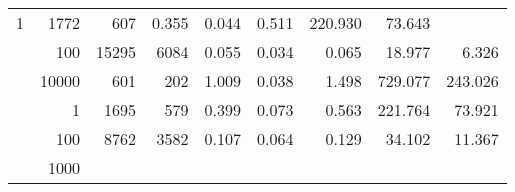 \begin{table}
\begin{tabular}{rrrrrrrrr}
					
					 
					\multirow{ 1 }{*}{ 1 } &
					
						
							    
							     1772  & 607  
	                           & 0.355 & 0.044 & 0.511
	                           & 220.930 & 73.643  \\
	                
	            
					 &  
					 
					\multirow{ 1 }{*}{ 100 } &
					
						
							    
							     15295  & 6084  
	                           & 0.055 & 0.034 & 0.065
	                           & 18.977 & 6.326  \\
	                
	            
					 &  
					 
					\multirow{ 1 }{*}{ 10000 } &
					
						
							    
							     601  & 202  
	                           & 1.009 & 0.038 & 1.498
	                           & 729.077 & 243.026  \\
	                
	            
	        
				\noalign{\smallskip}\hline
				\multirow{ 4 }{*}{ 1000000 } &
				
					
					 
					\multirow{ 1 }{*}{ 1 } &
					
						
							    
							     1695  & 579  
	                           & 0.399 & 0.073 & 0.563
	                           & 221.764 & 73.921  \\
	                
	            
					 &  
					 
					\multirow{ 1 }{*}{ 100 } &
					
						
							    
							     8762  & 3582  
	                           & 0.107 & 0.064 & 0.129
	                           & 34.102 & 11.367  \\
	                
	            
					 &  
					 
					\multirow{ 1 }{*}{ 1000 } &
					
						
							    

\end{tabular}
\end{table}
